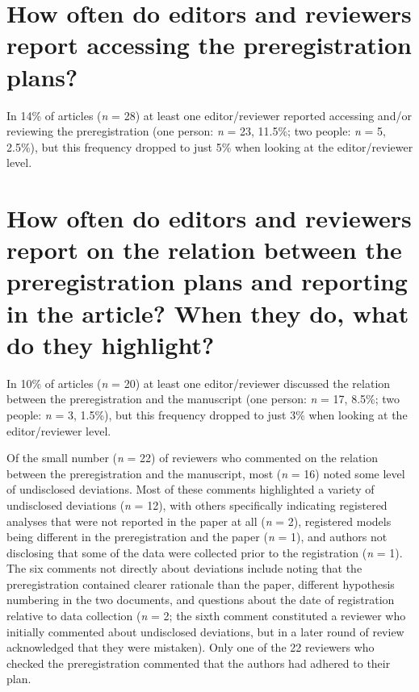 \documentclass[authordate, empirical]{jote-new-article}
\begin{document}
	\section{\textbf{How often do editors and reviewers report accessing the preregistration plans?}}



	In 14\% of articles (\emph{n} = 28) at least one editor/reviewer reported accessing and/or reviewing the preregistration (one person: \emph{n} = 23, 11.5\%; two people: \emph{n} = 5, 2.5\%), but this frequency dropped to just 5\% when looking at the editor/reviewer level.



	\section{\textbf{How often do editors and reviewers report on the relation between the preregistration plans and reporting in the article? When they do, what do they highlight?}}



	In 10\% of articles (\emph{n} = 20) at least one editor/reviewer discussed the relation between the preregistration and the manuscript (one person: \emph{n} = 17, 8.5\%; two people: \emph{n} = 3, 1.5\%), but this frequency dropped to just 3\% when looking at the editor/reviewer level.



	Of the small number (\emph{n} = 22) of reviewers who commented on the relation between the preregistration and the manuscript, most (\emph{n} = 16) noted some level of undisclosed deviations. Most of these comments highlighted a variety of undisclosed deviations (\emph{n} = 12), with others specifically indicating registered analyses that were not reported in the paper at all (\emph{n} = 2), registered models being different in the preregistration and the paper (\emph{n} = 1), and authors not disclosing that some of the data were collected prior to the registration (\emph{n} = 1). The six comments not directly about deviations include noting that the preregistration contained clearer rationale than the paper, different hypothesis numbering in the two documents, and questions about the date of registration relative to data collection (\emph{n} = 2; the sixth comment constituted a reviewer who initially commented about undisclosed deviations, but in a later round of review acknowledged that they were mistaken). Only one of the 22 reviewers who checked the preregistration commented that the authors had adhered to their plan.
\end{document}
